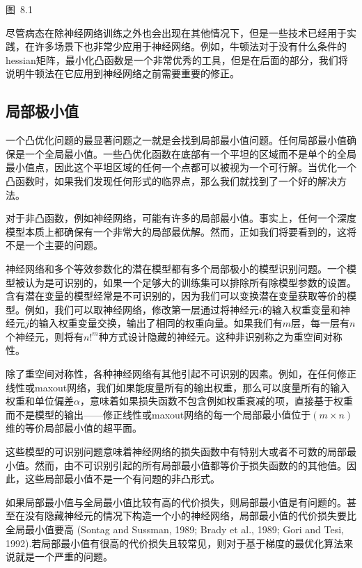 \begin{center}
图~8.1
\end{center}

尽管病态在除神经网络训练之外也会出现在其他情况下，但是一些技术已经用于实践，在许多场景下也非常少应用于神经网络。例如，牛顿法对于没有什么条件的hessian矩阵，最小化凸函数是一个非常优秀的工具，但是在后面的部分，我们将说明牛顿法在它应用到神经网络之前需要重要的修正。

\subsection{局部极小值}
一个凸优化问题的最显著问题之一就是会找到局部最小值问题。任何局部最小值确保是一个全局最小值。一些凸优化函数在底部有一个平坦的区域而不是单个的全局最小值点，因此这个平坦区域的任何一个点都可以被视为一个可行解。当优化一个凸函数时，如果我们发现任何形式的临界点，那么我们就找到了一个好的解决方法。

对于非凸函数，例如神经网络，可能有许多的局部最小值。事实上，任何一个深度模型本质上都确保有一个非常大的局部最优解。然而，正如我们将要看到的，这将不是一个主要的问题。

神经网络和多个等效参数化的潜在模型都有多个局部极小的模型识别问题。一个模型被认为是可识别的，如果一个足够大的训练集可以排除所有除模型参数的设置。含有潜在变量的模型经常是不可识别的，因为我们可以变换潜在变量获取等价的模型。例如，我们可以取神经网络，修改第一层通过将神经元$i$的输入权重变量和神经元$j$的输入权重变量交换，输出了相同的权重向量。如果我们有$m$层，每一层有$n$个神经元，则将有$n!^m$种方式设计隐藏的神经元。这种非识别称之为重空间对称性。

除了重空间对称性，各种神经网络有其他引起不可识别的因素。例如，在任何修正线性或maxout网络，我们如果能度量所有的输出权重，那么可以度量所有的输入权重和单位偏差$\alpha$，意味着如果损失函数不包含例如权重衰减的项，直接基于权重而不是模型的输出——修正线性或maxout网络的每一个局部最小值位于$(m\times n)$维的等价局部最小值的超平面。

这些模型的可识别问题意味着神经网络的损失函数中有特别大或者不可数的局部最小值。然而，由不可识别引起的所有局部最小值都等价于损失函数的的其他值。因此，这些局部最小值不是一个有问题的非凸形式。

如果局部最小值与全局最小值比较有高的代价损失，则局部最小值是有问题的。甚至在没有隐藏神经元的情况下构造一个小的神经网络，局部最小值的代价损失要比全局最小值要高
(Sontag and Sussman, 1989; Brady et al., 1989; Gori and Tesi, 1992).若局部最小值有很高的代价损失且较常见，则对于基于梯度的最优化算法来说就是一个严重的问题。

